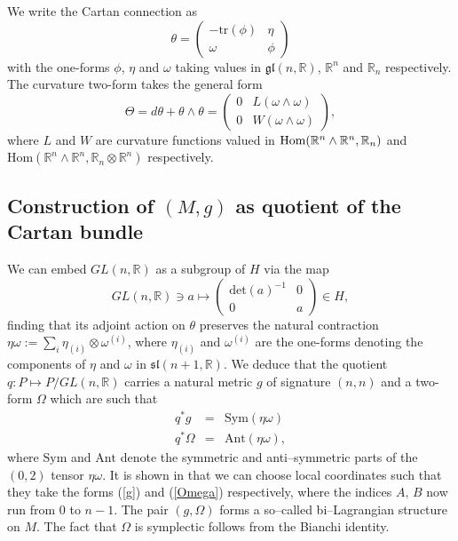 \noindent We write the Cartan connection as
\[
\theta=\begin{pmatrix}-\mathrm{tr}(\phi) & \eta\\
\omega & \phi
\end{pmatrix}
\]
with the one-forms $\phi$, $\eta$ and $\omega$ taking values
in $\mathfrak{gl}(n,\mathbb{R})$, $\mathbb{R}^{n}$ and $\mathbb{R}_{n}$
respectively. The curvature two-form takes the general form
\begin{equation}
\Theta={d}\theta+\theta\wedge\theta=\begin{pmatrix}0 & L(\omega\wedge\omega)\\
0 & W(\omega\wedge\omega)
\end{pmatrix},\label{eq:curvature_2-form}
\end{equation}
where $L$ and $W$ are curvature functions valued in $\mathrm{Hom}(\mathbb{R}^n\wedge\mathbb{R}^n,\mathbb{R}_n)$ and $\mathrm{Hom}(\mathbb{R}^{n}\wedge\mathbb{R}^{n},\mathbb{R}_{n}\otimes\mathbb{R}^{n})$ respectively.

\subsection{Construction of $(M,g)$ as quotient of the Cartan bundle}
We can embed $GL(n,\mathbb{R})$ as a subgroup of $H$ via the map
\begin{equation}
GL(n,\mathbb{R})\ni a\longmapsto\begin{pmatrix}\mathrm{det}(a)^{-1} & 0\\
0 & a
\end{pmatrix}\in H,\label{eq:gl(n)_embed_H}
\end{equation}
finding that its adjoint action on $\theta$ preserves the natural
contraction $\eta\omega:=\sum_{i}\eta_{(i)}\otimes\omega^{(i)}$,
where $\eta_{(i)}$ and $\omega^{(i)}$ are the one-forms denoting
the components of $\eta$ and $\omega$ in $\mathfrak{sl}(n+1,\mathbb{R})$. We deduce that the quotient $q:P\mapsto P/GL(n,\mathbb{R})$
carries a natural metric $g$ of signature $(n,n)$ and a two-form
$\Omega$ which are such that
\begin{eqnarray*}
q^{*}g & = & \mathrm{Sym}(\eta\omega)\\
q^{*}\Omega & = & \mathrm{Ant}(\eta\omega),
\end{eqnarray*}
where $\mathrm{Sym}$ and $\mathrm{Ant}$ denote the symmetric and anti--symmetric parts of the $(0,2)$ tensor $\eta\omega$.
It is shown in \cite{DM} that we can choose local coordinates such that they take the forms
(\ref{g}) and (\ref{Omega}) respectively,
where the indices $A,\,B$ now run from $0$ to $n-1$. The pair $(g,\Omega)$ forms a so--called bi--Lagrangian structure on $M$. The fact that $\Omega$ is symplectic follows from the Bianchi identity.

